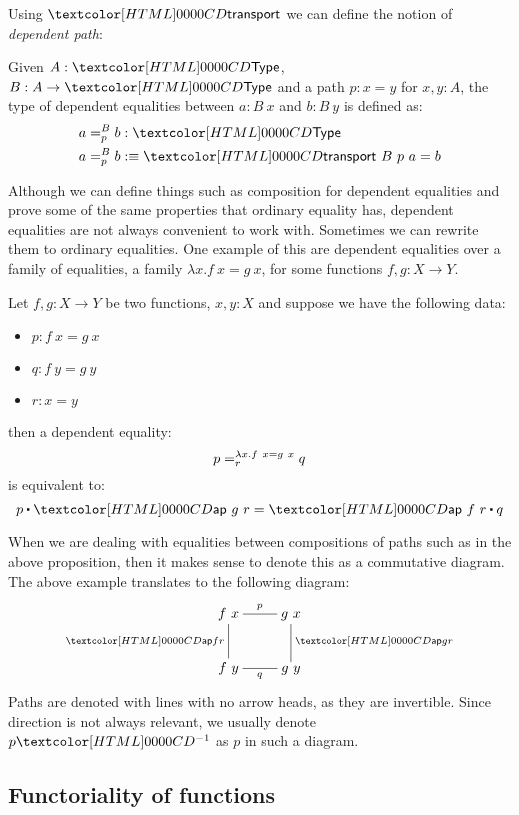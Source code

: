 Using $\transport$ we can define the notion of \emph{dependent path}:
\begin{definition}
  Given $A : \Type$, $B : A \to \Type$ and a path $p : x = y$ for
  $x, y : A$, the type of dependent equalities between $a : B\ x$ and
  $b : B\ y$ is defined as:
  \begin{align*}
    &\pathover{B}{p}{a}{b} : \Type \\
    &\pathover{B}{p}{a}{b} \ddefeq \transport\ B\ p\ a = b
  \end{align*}
\end{definition}

Although we can define things such as composition for dependent
equalities and prove some of the same properties that ordinary
equality has, dependent equalities are not always convenient to work
with. Sometimes we can rewrite them to ordinary equalities. One
example of this are dependent equalities over a family of equalities,
\ie a family $\lambda x . f\ x = g\ x$, for some functions
$f, g : X \to Y$.

\begin{proposition}
  Let $f, g : X \to Y$ be two functions, $x, y : X$ and suppose we
  have the following data:
  \begin{itemize}
  \item $p : f\ x = g\ x$
  \item $q : f\ y = g\ y$
  \item $r : x = y$
  \end{itemize}
  then a dependent equality:
  $$
  \pathover{\lambda x . f\ x = g\ x}{r}{p}{q}
  $$
  is equivalent to:
  $$
  p \ct \ap\ g\ r = \ap\ f\ r \ct q
  $$
\end{proposition}

\begin{remark}
  When we are dealing with equalities between compositions of paths
  such as in the above proposition, then it makes sense to denote this
  as a commutative diagram. The above example translates to the
  following diagram:
  $$
  \xymatrix{
    f\ x 
    \ar@{-}[r]^{p}
    \ar@{-}[d]_{\ap f r}
    &g\ x
    \ar@{-}[d]^{\ap g r}
    \\
    f\ y
    \ar@{-}[r]_{q}
    &g\ y
  }
  $$
  Paths are denoted with lines with no arrow heads, as they are
  invertible. Since direction is not always relevant, we usually
  denote $\sym{p}$ as $p$ in such a diagram.
\end{remark}

\subsection{Functoriality of functions}

